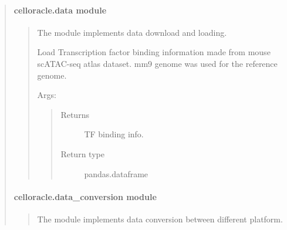 \documentclass[letterpaper,10pt,english]{sphinxmanual}
\begin{document}
\begin{quote}
\begin{quote}
\begin{fulllineitems}
\end{fulllineitems}

\end{quote}


\paragraph{celloracle.data module}
\label{\detokenize{modules/celloracle.data:celloracle-data-module}}\label{\detokenize{modules/celloracle.data::doc}}\begin{quote}
\label{\detokenize{modules/celloracle.data:module-celloracle.data}}
The {\hyperref[\detokenize{modules/celloracle.data:module-celloracle.data}]{}} module implements data download and loading.

\begin{fulllineitems}
\label{\detokenize{modules/celloracle.data:celloracle.data.load_TFinfo_df_mm9_mouse_atac_atlas}}
Load Transcription factor binding information made from mouse scATAC-seq atlas dataset.
mm9 genome was used for the reference genome.

Args:
\begin{quote}\begin{description}
\item[{Returns}] \leavevmode
TF binding info.

\item[{Return type}] \leavevmode
pandas.dataframe

\end{description}\end{quote}

\end{fulllineitems}

\end{quote}


\paragraph{celloracle.data\_conversion module}
\label{\detokenize{modules/celloracle.data_conversion:celloracle-data-conversion-module}}\label{\detokenize{modules/celloracle.data_conversion::doc}}\begin{quote}
\label{\detokenize{modules/celloracle.data_conversion:module-celloracle.data_conversion}}
The {\hyperref[\detokenize{modules/celloracle.data_conversion:module-celloracle.data_conversion}]{}} module implements data conversion between different platform.


\end{quote}
\end{quote}
\end{document}

